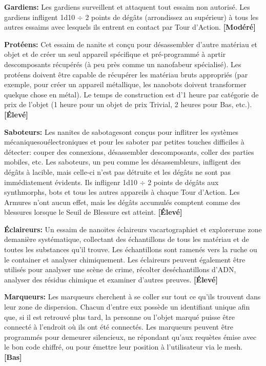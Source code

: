 \textbf{Gardiens:} Les gardiens surveillent et attaquent tout essaim non autorisé. Les gardiens infligent 1d10 $\div$ 2 points de dégâts (arrondissez au supérieur) à tous les autres essaims avec lesquels ils entrent en contact par Tour d'Action. \textbf{[Modéré]} 

\textbf{Protéens:} Cet essaim de nanite st conçu pour désassembler d'autre matériau et objet et de créer un seul appareil spécifique et pré-programmé à aprtir descomposants récupérés (à peu près comme un nanofabeur spécialisé). Les protéens doivent être capable de récupérer les matériau bruts appropriés (par exemple, pour créer un appareil métallique, les nanobots doivent transformer quelque chose en métal). Le temps de construction est d'1 heure par catégorie de prix de l'objet (1 heure pour un objet de prix Trivial, 2 heures pour Bas, etc.). \textbf{[Élevé]} 

\textbf{Saboteurs:} Les nanites de sabotagesont conçus pour inflitrer les systèmes mécaniquesouélectroniques et pour les saboter par petites touches difficiles à détecter: couper des connexions, désassembler descomposants, coller des parties mobiles, etc. Les saboteurs, un peu comme les désassembleurs, infligent des dégâts à lacible, mais celle-ci n'est pas détruite et les dégâts ne sont pas immédiatement évidents. Ils infligenr 1d10 $\div$ 2 points de dégâts aux synthmorphs, bots et tous les autres appareils à chaque Tour d'Action. Les Armures n'ont aucun effet, mais les dégâts accumulés comptent comme des blessures lorsque le Seuil de Blessure est atteint. \textbf{[Élevé]} 

\textbf{Éclaireurs:} Un essaim de nanoites éclaireurs vacartographiet et explorerune zone demanière systématique, collectant des échantillons de tous les matériau et de toutes les substances qu'il trouve. Les échantillons sont ramenés vers la ruche ou le container et analyser chimiquement. Les éclaireurs peuvent également être utilisés pour analyser une scène de crime, récolter deséchantillons d'ADN, analyser des résidus chimique et examiner d'autres preuves. \textbf{[Élevé]} 

\textbf{Marqueurs:} Les marqueurs cherchent à se coller sur tout ce qu'ils trouvent dans leur zone de dispersion. Chacun d'entre eux possède un identifiant unique afin que, si il est retrouvé plus tard, la personne ou l'objet marqué puisse être connecté à l'endroit où ils ont été connectés. Les marqueurs peuvent être programmés pour demeurer silencieux, ne répondant qu'aux requètes émise avec le bon code chiffré, ou pour émettre leur position à l'utilisateur via le mesh. \textbf{[Bas]} 

